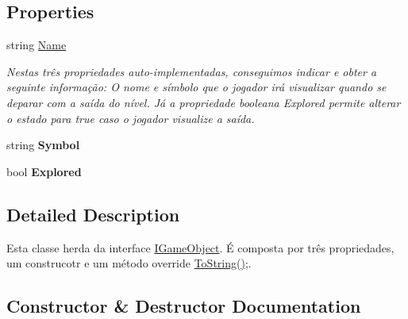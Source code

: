 \subsection*{Properties}
\begin{DoxyCompactItemize}
\item 
string \mbox{\hyperlink{class_projeto2___l_p1_1_1_exit_a3219ddad15e0d2907e212e0b4a57da4c}{Name}}
\begin{DoxyCompactList}\small\item\em Nestas três propriedades auto-\/implementadas, conseguimos indicar e obter a seguinte informação\+: O nome e símbolo que o jogador irá visualizar quando se deparar com a saída do nível. Já a propriedade booleana Explored permite alterar o estado para true caso o jogador visualize a saída. \end{DoxyCompactList}\item 
\mbox{\label{class_projeto2___l_p1_1_1_exit_ad61dadb9e022a62bd175e17d2aac4039}} 
string {\bfseries Symbol}
\item 
\mbox{\label{class_projeto2___l_p1_1_1_exit_a5b448bfe0336df5b60376cf3b1875632}} 
bool {\bfseries Explored}
\end{DoxyCompactItemize}


\subsection{Detailed Description}
Esta classe herda da interface \mbox{\hyperlink{interface_projeto2___l_p1_1_1_i_game_object}{I\+Game\+Object}}. É composta por três propriedades, um construcotr e um método override \mbox{\hyperlink{class_projeto2___l_p1_1_1_exit_a45f6b4cb0db046f8b31859370aff2f92}{To\+String()}};. 



\subsection{Constructor \& Destructor Documentation}
\mbox{\label{class_projeto2___l_p1_1_1_exit_a0349c71f77345fcc751db7c4c9156fe5}} 
